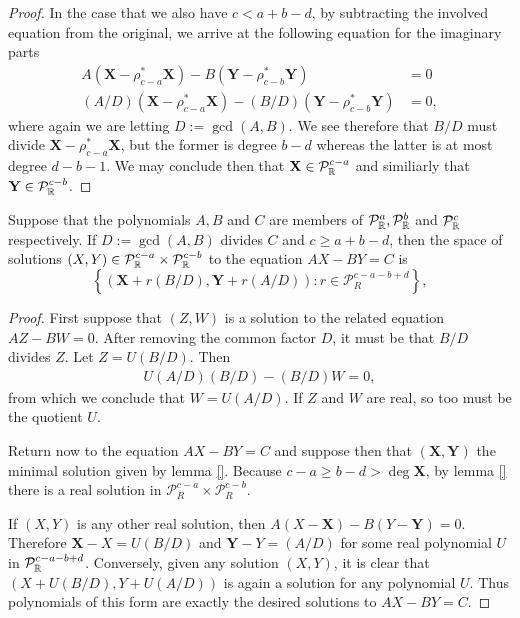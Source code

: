 \documentclass{article}
\begin{document}
\begin{lem}
\begin{proof}
In the case that we also have $c<a+b-d$, by subtracting the involved equation from the original, we arrive at the following equation for the imaginary parts
\begin{align*}
A\left(\mathbf{X} - \rho_{c-a}^*\mathbf{X} \right)
-B\left(\mathbf{Y} - \rho_{c-b}^*\mathbf{Y} \right)
&= 0 \\
(A/D)\left(\mathbf{X} - \rho_{c-a}^*\mathbf{X} \right)
-(B/D)\left(\mathbf{Y} - \rho_{c-b}^*\mathbf{Y} \right)
&= 0,
\end{align*}
where again we are letting $D:= \gcd(A,B)$. We see therefore that $B/D$ must divide $\mathbf{X} - \rho_{c-a}^*\mathbf{X}$, but the former is degree $b-d$ whereas the latter is at most degree $d-b-1$. We may conclude then that $\mathbf{X} \in \mathcal{P}_{\mathbb{R}}^{c-a}$ and similiarly that $\mathbf{Y} \in \mathcal{P}_{\mathbb{R}}^{c-b}$.
\end{proof}
\end{lem}

\begin{lem}
Suppose that the polynomials $A,B$ and $C$ are members of $\mathcal{P}^a_{\mathbb{R}}, \mathcal{P}^b_{\mathbb{R}}$ and $\mathcal{P}^c_{\mathbb{R}}$ respectively. If $D := \gcd(A,B)$ divides $C$ and $c \geq a+b-d$, then the space of solutions $(X,Y) \in \mathcal{P}^{c-a}_{\mathbb{R}} \times \mathcal{P}^{c-b}_{\mathbb{R}}$ to the equation $AX - BY = C$ is
\[
\left\{(\mathbf{X} + r(B/D), \mathbf{Y} + r(A/D)) : r \in \mathcal{P}_R^{c-a-b+d} \right\},
\]

\begin{proof}
First suppose that $(Z,W)$ is a solution to the related equation $AZ-BW = 0$. After removing the common factor $D$, it must be that $B/D$ divides $Z$. Let $Z = U (B/D)$. Then
\begin{align*}
U (A/D)(B/D) - (B/D) W = 0,
\end{align*}
from which we conclude that $W = U (A/D)$. If $Z$ and $W$ are real, so too must be the quotient $U$.

Return now to the equation $AX-BY=C$ and suppose then that $(\mathbf{X},\mathbf{Y})$ the minimal solution given by lemma \ref{}.
Because $c-a \geq b-d > \deg \mathbf{X}$, by lemma \ref{} there is a real solution in $\mathcal{P}^{c-a}_R \times \mathcal{P}^{c-b}_R$.

If $(X,Y)$ is any other real solution, then $A(X-\mathbf{X}) - B(Y-\mathbf{Y}) = 0$. Therefore $\mathbf{X}-X = U (B/D)$ and $\mathbf{Y}-Y = (A/D)$ for some real polynomial $U$ in $\mathcal{P}_{\mathbb{R}}^{c-a-b+d}$. Conversely, given any solution $(X,Y)$, it is clear that $(X+U(B/D),Y+U(A/D))$ is again a solution for any polynomial $U$.
Thus polynomials of this form are exactly the desired solutions to $AX-BY=C$.
\end{proof}
\end{lem}
\end{document}
